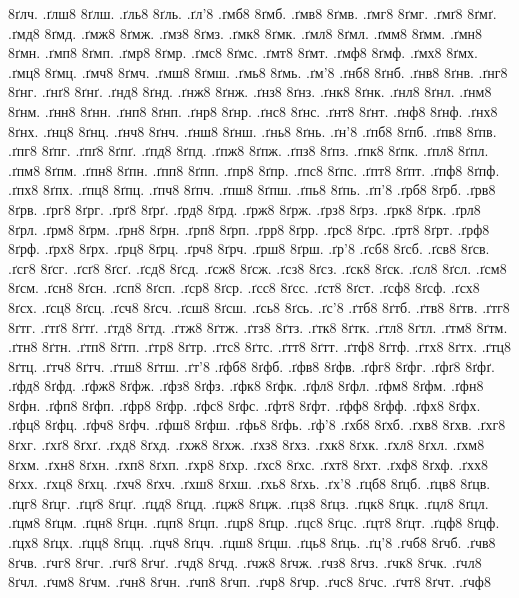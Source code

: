 {8ґлч.
.ґлш8
8ґлш.
.ґль8
8ґль.
.ґл'8
.ґмб8
8ґмб.
.ґмв8
8ґмв.
.ґмг8
8ґмг.
.ґмґ8
8ґмґ.
.ґмд8
8ґмд.
.ґмж8
8ґмж.
.ґмз8
8ґмз.
.ґмк8
8ґмк.
.ґмл8
8ґмл.
.ґмм8
8ґмм.
.ґмн8
8ґмн.
.ґмп8
8ґмп.
.ґмр8
8ґмр.
.ґмс8
8ґмс.
.ґмт8
8ґмт.
.ґмф8
8ґмф.
.ґмх8
8ґмх.
.ґмц8
8ґмц.
.ґмч8
8ґмч.
.ґмш8
8ґмш.
.ґмь8
8ґмь.
.ґм'8
.ґнб8
8ґнб.
.ґнв8
8ґнв.
.ґнг8
8ґнг.
.ґнґ8
8ґнґ.
.ґнд8
8ґнд.
.ґнж8
8ґнж.
.ґнз8
8ґнз.
.ґнк8
8ґнк.
.ґнл8
8ґнл.
.ґнм8
8ґнм.
.ґнн8
8ґнн.
.ґнп8
8ґнп.
.ґнр8
8ґнр.
.ґнс8
8ґнс.
.ґнт8
8ґнт.
.ґнф8
8ґнф.
.ґнх8
8ґнх.
.ґнц8
8ґнц.
.ґнч8
8ґнч.
.ґнш8
8ґнш.
.ґнь8
8ґнь.
.ґн'8
.ґпб8
8ґпб.
.ґпв8
8ґпв.
.ґпг8
8ґпг.
.ґпґ8
8ґпґ.
.ґпд8
8ґпд.
.ґпж8
8ґпж.
.ґпз8
8ґпз.
.ґпк8
8ґпк.
.ґпл8
8ґпл.
.ґпм8
8ґпм.
.ґпн8
8ґпн.
.ґпп8
8ґпп.
.ґпр8
8ґпр.
.ґпс8
8ґпс.
.ґпт8
8ґпт.
.ґпф8
8ґпф.
.ґпх8
8ґпх.
.ґпц8
8ґпц.
.ґпч8
8ґпч.
.ґпш8
8ґпш.
.ґпь8
8ґпь.
.ґп'8
.ґрб8
8ґрб.
.ґрв8
8ґрв.
.ґрг8
8ґрг.
.ґрґ8
8ґрґ.
.ґрд8
8ґрд.
.ґрж8
8ґрж.
.ґрз8
8ґрз.
.ґрк8
8ґрк.
.ґрл8
8ґрл.
.ґрм8
8ґрм.
.ґрн8
8ґрн.
.ґрп8
8ґрп.
.ґрр8
8ґрр.
.ґрс8
8ґрс.
.ґрт8
8ґрт.
.ґрф8
8ґрф.
.ґрх8
8ґрх.
.ґрц8
8ґрц.
.ґрч8
8ґрч.
.ґрш8
8ґрш.
.ґр'8
.ґсб8
8ґсб.
.ґсв8
8ґсв.
.ґсг8
8ґсг.
.ґсґ8
8ґсґ.
.ґсд8
8ґсд.
.ґсж8
8ґсж.
.ґсз8
8ґсз.
.ґск8
8ґск.
.ґсл8
8ґсл.
.ґсм8
8ґсм.
.ґсн8
8ґсн.
.ґсп8
8ґсп.
.ґср8
8ґср.
.ґсс8
8ґсс.
.ґст8
8ґст.
.ґсф8
8ґсф.
.ґсх8
8ґсх.
.ґсц8
8ґсц.
.ґсч8
8ґсч.
.ґсш8
8ґсш.
.ґсь8
8ґсь.
.ґс'8
.ґтб8
8ґтб.
.ґтв8
8ґтв.
.ґтг8
8ґтг.
.ґтґ8
8ґтґ.
.ґтд8
8ґтд.
.ґтж8
8ґтж.
.ґтз8
8ґтз.
.ґтк8
8ґтк.
.ґтл8
8ґтл.
.ґтм8
8ґтм.
.ґтн8
8ґтн.
.ґтп8
8ґтп.
.ґтр8
8ґтр.
.ґтс8
8ґтс.
.ґтт8
8ґтт.
.ґтф8
8ґтф.
.ґтх8
8ґтх.
.ґтц8
8ґтц.
.ґтч8
8ґтч.
.ґтш8
8ґтш.
.ґт'8
.ґфб8
8ґфб.
.ґфв8
8ґфв.
.ґфг8
8ґфг.
.ґфґ8
8ґфґ.
.ґфд8
8ґфд.
.ґфж8
8ґфж.
.ґфз8
8ґфз.
.ґфк8
8ґфк.
.ґфл8
8ґфл.
.ґфм8
8ґфм.
.ґфн8
8ґфн.
.ґфп8
8ґфп.
.ґфр8
8ґфр.
.ґфс8
8ґфс.
.ґфт8
8ґфт.
.ґфф8
8ґфф.
.ґфх8
8ґфх.
.ґфц8
8ґфц.
.ґфч8
8ґфч.
.ґфш8
8ґфш.
.ґфь8
8ґфь.
.ґф'8
.ґхб8
8ґхб.
.ґхв8
8ґхв.
.ґхг8
8ґхг.
.ґхґ8
8ґхґ.
.ґхд8
8ґхд.
.ґхж8
8ґхж.
.ґхз8
8ґхз.
.ґхк8
8ґхк.
.ґхл8
8ґхл.
.ґхм8
8ґхм.
.ґхн8
8ґхн.
.ґхп8
8ґхп.
.ґхр8
8ґхр.
.ґхс8
8ґхс.
.ґхт8
8ґхт.
.ґхф8
8ґхф.
.ґхх8
8ґхх.
.ґхц8
8ґхц.
.ґхч8
8ґхч.
.ґхш8
8ґхш.
.ґхь8
8ґхь.
.ґх'8
.ґцб8
8ґцб.
.ґцв8
8ґцв.
.ґцг8
8ґцг.
.ґцґ8
8ґцґ.
.ґцд8
8ґцд.
.ґцж8
8ґцж.
.ґцз8
8ґцз.
.ґцк8
8ґцк.
.ґцл8
8ґцл.
.ґцм8
8ґцм.
.ґцн8
8ґцн.
.ґцп8
8ґцп.
.ґцр8
8ґцр.
.ґцс8
8ґцс.
.ґцт8
8ґцт.
.ґцф8
8ґцф.
.ґцх8
8ґцх.
.ґцц8
8ґцц.
.ґцч8
8ґцч.
.ґцш8
8ґцш.
.ґць8
8ґць.
.ґц'8
.ґчб8
8ґчб.
.ґчв8
8ґчв.
.ґчг8
8ґчг.
.ґчґ8
8ґчґ.
.ґчд8
8ґчд.
.ґчж8
8ґчж.
.ґчз8
8ґчз.
.ґчк8
8ґчк.
.ґчл8
8ґчл.
.ґчм8
8ґчм.
.ґчн8
8ґчн.
.ґчп8
8ґчп.
.ґчр8
8ґчр.
.ґчс8
8ґчс.
.ґчт8
8ґчт.
.ґчф8
}
